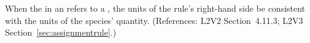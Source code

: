 When the  in an \AssignmentRule refers to a \Species, the
units of the rule's right-hand side  be consistent with the units of
the species' quantity.  (References: L2V2 Section~4.11.3;
L2V3 Section~\ref{sec:assignmentrule}.)
